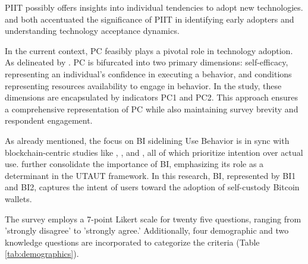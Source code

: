 \documentclass[twocolumn]{article}
\begin{document}
PIIT possibly offers insights into individual tendencies to adopt new technologies. \textcite{agarwal_conceptual_1998} and \textcite{ng_factors_2021} both accentuated the significance of PIIT in identifying early adopters and understanding technology acceptance dynamics. 

In the current context, PC feasibly plays a pivotal role in technology adoption. As delineated by \textcite{taylor_understanding_1995}. PC is bifurcated into two primary dimensions: self-efficacy, representing an individual's confidence in executing a behavior, and conditions representing resources availability to engage in behavior. In the study, these dimensions are encapsulated by indicators PC1 and PC2. This approach ensures a comprehensive representation of PC while also maintaining survey brevity and respondent engagement.

As already mentioned, the focus on BI sidelining Use Behavior is in sync with blockchain-centric studies like \textcite{radic_you_2022}, \textcite{chang_acceptance_2022}, and \textcite{queiroz_blockchain_2019}, all of which prioritize intention over actual use. \textcite{venkatesh_user_2003, venkatesh_consumer_2012} further consolidate the importance of BI, emphasizing its role as a determinant in the UTAUT framework. In this research, BI, represented by BI1 and BI2, captures the intent of users toward the adoption of self-custody Bitcoin wallets.

The survey employs a 7-point Likert scale for twenty five questions, ranging from 'strongly disagree' to 'strongly agree.' Additionally, four demographic and two knowledge questions are incorporated to categorize the criteria (Table \ref{tab:demographics}).
\end{document}
